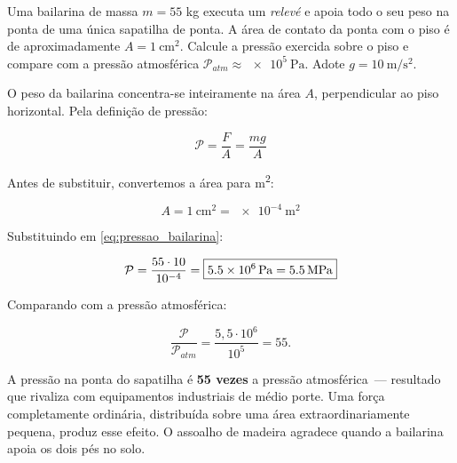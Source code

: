 \begin{exemplo}[Nível I]\label{exemplo_fluidos_pressaoex01}

Uma bailarina de massa $m=55$ kg executa um \emph{relevé} e apoia todo o seu peso na ponta de uma única sapatilha de ponta. A área de contato da ponta com o piso é de aproximadamente $A = \SI{1}{\centi\metre\squared}$. Calcule a pressão exercida sobre
o piso e compare com a pressão atmosférica $\mathcal{P}_{atm} \approx \SI{e5}{\pascal}$.
Adote $g = \SI{10}{\metre\per\second\squared}$.

\resolucao

O peso da bailarina concentra-se inteiramente na área $A$,
perpendicular ao piso horizontal. Pela definição de pressão:
 
\begin{equation}
    \mathcal{P} = \frac{F}{A} = \frac{mg}{A}
    \label{eq:pressao_bailarina} 
\end{equation}
 
Antes de substituir, convertemos a área para \si{\metre\squared}:
 
\begin{equation*}
    A = \SI{1}{\centi\metre\squared} = \SI{e-4}{\metre\squared}
\end{equation*}
 
Substituindo em \eqref{eq:pressao_bailarina}:
 
\begin{equation*}
    \mathcal{P} = \frac{55 \cdot 10}{10^{-4}}
    = \boxed{\SI{5{,}5e6}{\pascal} = \SI{5{,}5}{\mega\pascal}}
\end{equation*}
 
Comparando com a pressão atmosférica:
 
\begin{equation*}
    \frac{\mathcal{P}}{\mathcal{P}_{atm}}
    = \frac{5{,}5 \cdot 10^6}{10^5} = 55.
\end{equation*}
 
A pressão na ponta do sapatilha é \textbf{55 vezes} a pressão
atmosférica~--- resultado que rivaliza com equipamentos industriais
de médio porte. Uma força completamente ordinária, distribuída sobre
uma área extraordinariamente pequena, produz esse efeito. O assoalho
de madeira agradece quando a bailarina apoia os dois pés no solo.

\end{exemplo}






\vspace{0.3cm}






